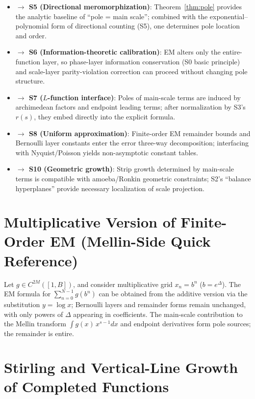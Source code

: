 \documentclass[11pt,a4paper]{article}
\theoremstyle{remark}
\begin{document}
\begin{itemize}
\item \textbf{$\to$ S5 (Directional meromorphization)}: Theorem~\ref{thm:pole} provides the analytic baseline of ``pole = main scale''; combined with the exponential--polynomial form of directional counting (S5), one determines pole location and order.

\item \textbf{$\to$ S6 (Information-theoretic calibration)}: EM alters only the entire-function layer, so phase-layer information conservation (S0 basic principle) and scale-layer parity-violation correction can proceed without changing pole structure.

\item \textbf{$\to$ S7 ($L$-function interface)}: Poles of main-scale terms are induced by archimedean factors and endpoint leading terms; after normalization by S3's $r(s)$, they embed directly into the explicit formula.

\item \textbf{$\to$ S8 (Uniform approximation)}: Finite-order EM remainder bounds and Bernoulli layer constants enter the error three-way decomposition; interfacing with Nyquist/Poisson yields non-asymptotic constant tables.

\item \textbf{$\to$ S10 (Geometric growth)}: Strip growth determined by main-scale terms is compatible with amoeba/Ronkin geometric constraints; S2's ``balance hyperplanes'' provide necessary localization of scale projection.
\end{itemize}

\appendix

\section{Multiplicative Version of Finite-Order EM (Mellin-Side Quick Reference)}

Let $g\in C^{2M}([1,B])$, and consider multiplicative grid $x_n=b^n$ ($b=e^{\Delta}$). The EM formula for $\sum_{n=0}^{N-1}g(b^n)$ can be obtained from the additive version via the substitution $y=\log x$; Bernoulli layers and remainder forms remain unchanged, with only powers of $\Delta$ appearing in coefficients. The main-scale contribution to the Mellin transform $\int g(x)\,x^{s-1}dx$ and endpoint derivatives form pole sources; the remainder is entire.

\section{Stirling and Vertical-Line Growth of Completed Functions}
\end{document}
